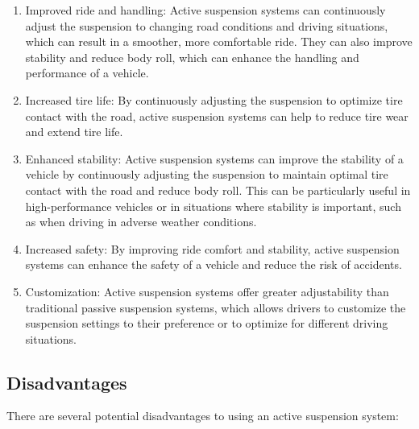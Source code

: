 \documentclass{article}
\begin{document}
\begin{enumerate}
    \item Improved ride and handling: Active suspension systems can continuously adjust the suspension to changing road conditions and driving situations, which can result in a smoother, more comfortable ride. They can also improve stability and reduce body roll, which can enhance the handling and performance of a vehicle.
    
    \item Increased tire life: By continuously adjusting the suspension to optimize tire contact with the road, active suspension systems can help to reduce tire wear and extend tire life.
    
    \item Enhanced stability: Active suspension systems can improve the stability of a vehicle by continuously adjusting the suspension to maintain optimal tire contact with the road and reduce body roll. This can be particularly useful in high-performance vehicles or in situations where stability is important, such as when driving in adverse weather conditions.
    
    \item Increased safety: By improving ride comfort and stability, active suspension systems can enhance the safety of a vehicle and reduce the risk of accidents.
    
    \item Customization: Active suspension systems offer greater adjustability than traditional passive suspension systems, which allows drivers to customize the suspension settings to their preference or to optimize for different driving situations.
\end{enumerate}

\subsection{Disadvantages}

There are several potential disadvantages to using an active suspension system:
\end{document}
